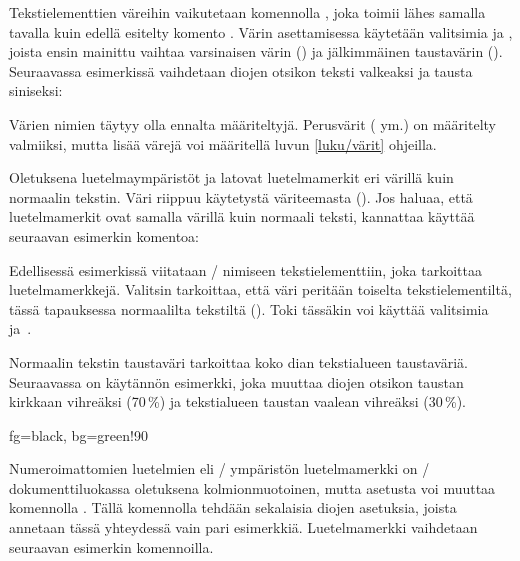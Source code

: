 Tekstielementtien väreihin vaikutetaan komennolla
, joka toimii lähes samalla tavalla kuin edellä
esitelty komento . Värin asettamisessa käytetään
valitsimia  ja , joista ensin mainittu vaihtaa
varsinaisen värin () ja jälkimmäinen taustavärin
(). Seuraavassa esimerkissä vaihdetaan diojen
otsikon teksti valkeaksi ja tausta siniseksi:

\begin{koodilohkosis}
\end{koodilohkosis}

\noindent
Värien nimien täytyy olla ennalta määriteltyjä. Perusvärit
( ym.) on määritelty
valmiiksi, mutta lisää värejä voi määritellä luvun \ref{luku/värit}
ohjeilla.

Oletuksena luetelmaympäristöt  ja
 latovat luetelmamerkit eri värillä kuin normaalin
tekstin. Väri riippuu käytetystä väriteemasta ().
Jos haluaa, että luetelmamerkit ovat samalla värillä kuin normaali
teksti, kannattaa käyttää seuraavan esimerkin komentoa:

\begin{koodilohkosis}
\end{koodilohkosis}

\noindent
Edellisessä esimerkissä viitataan \-/ nimiseen
tekstielementtiin, joka tarkoittaa luetelmamerkkejä. Valitsin
 tarkoittaa, että väri peritään toiselta
tekstielementiltä, tässä tapauksessa normaalilta tekstiltä
(). Toki tässäkin voi käyttää valitsimia
 ja~.

Normaalin tekstin taustaväri tarkoittaa koko dian tekstialueen
taustaväriä. Seuraavassa on käytännön esimerkki, joka muuttaa diojen
otsikon taustan kirkkaan vihreäksi (70\,\%) ja tekstialueen taustan
vaalean vihreäksi (30\,\%).

\begin{koodilohkosis}
 {fg=black, bg=green!90}
\end{koodilohkosis}

\noindent
Numeroimattomien luetelmien eli \-/ ympäristön
luetelmamerkki on \-/ dokumenttiluokassa oletuksena
kolmionmuotoinen, mutta asetusta voi muuttaa komennolla
. Tällä komennolla tehdään sekalaisia diojen
asetuksia, joista annetaan tässä yhteydessä vain pari esimerkkiä.
Luetelmamerkki vaihdetaan seuraavan esimerkin komennoilla.

